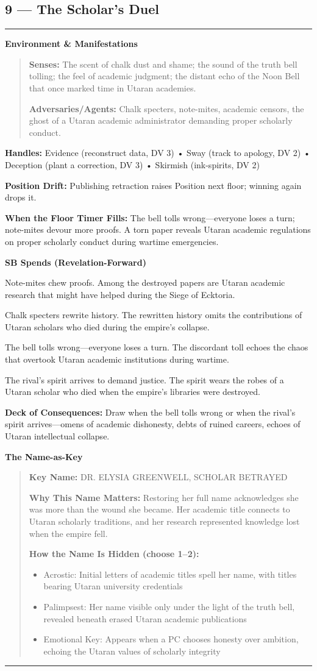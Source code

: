 \documentclass[18pt, letterpaper, twoside]{article}
\newenvironment{floorbox}[1]{%
    \begin{center}
    \begin{minipage}{0.95\textwidth}
    \subsection*{#1}
    \vspace{-0.5em}
    \rule{\textwidth}{0.5pt}
    \vspace{0.5em}
}{%
    \vspace{0.5em}
    \rule{\textwidth}{0.5pt}
    \end{minipage}
    \end{center}
}
\newenvironment{gmnote}[1]{%
    \vspace{0.5em}
    \noindent\textbf{#1}
    \begin{quote}
}{%
    \end{quote}
    \vspace{0.5em}
}
\newcommand{\handles}[1]{\noindent\textbf{Handles:} #1\par}
\newcommand{\sbitem}[2]{\item[#1 SB:] #2}
\newcommand{\deckdraw}[1]{\noindent\textbf{Deck of Consequences:} #1\par}
\newcommand{\keyname}[1]{\noindent\textbf{Key Name:} #1\par}
\newcommand{\nameimportance}[1]{\noindent\textbf{Why This Name Matters:} #1\par}
\begin{document}
\begin{floorbox}{9 --- The Scholar's Duel}
\begin{gmnote}{Environment \& Manifestations}
\textbf{Senses:} The scent of chalk dust and shame; the sound of the truth bell tolling; the feel of academic judgment; the distant echo of the Noon Bell that once marked time in Utaran academies.

\textbf{Adversaries/Agents:} Chalk specters, note-mites, academic censors, the ghost of a Utaran academic administrator demanding proper scholarly conduct.
\end{gmnote}

\handles{Evidence (reconstruct data, DV 3) • Sway (track to apology, DV 2) • Deception (plant a correction, DV 3) • Skirmish (ink-spirits, DV 2)}

\textbf{Position Drift:} Publishing retraction raises Position next floor; winning again drops it.

\textbf{When the Floor Timer Fills:} The bell tolls wrong---everyone loses a turn; note-mites devour more proofs. A torn paper reveals Utaran academic regulations on proper scholarly conduct during wartime emergencies.

\textbf{SB Spends (Revelation-Forward)}
\begin{description}[leftmargin=*, style=unboxed]
    \sbitem{1}{Note-mites chew proofs. Among the destroyed papers are Utaran academic research that might have helped during the Siege of Ecktoria.}
    \sbitem{2}{Chalk specters rewrite history. The rewritten history omits the contributions of Utaran scholars who died during the empire's collapse.}
    \sbitem{3}{The bell tolls wrong---everyone loses a turn. The discordant toll echoes the chaos that overtook Utaran academic institutions during wartime.}
    \sbitem{4+}{The rival's spirit arrives to demand justice. The spirit wears the robes of a Utaran scholar who died when the empire's libraries were destroyed.}
\end{description}

\deckdraw{Draw when the bell tolls wrong or when the rival's spirit arrives---omens of academic dishonesty, debts of ruined careers, echoes of Utaran intellectual collapse.}

\begin{gmnote}{The Name-as-Key}
\keyname{DR. ELYSIA GREENWELL, SCHOLAR BETRAYED}
\nameimportance{Restoring her full name acknowledges she was more than the wound she became. Her academic title connects to Utaran scholarly traditions, and her research represented knowledge lost when the empire fell.}

\textbf{How the Name Is Hidden (choose 1--2):}
\begin{itemize}[leftmargin=*]
    \item Acrostic: Initial letters of academic titles spell her name, with titles bearing Utaran university credentials
    \item Palimpsest: Her name visible only under the light of the truth bell, revealed beneath erased Utaran academic publications
    \item Emotional Key: Appears when a PC chooses honesty over ambition, echoing the Utaran values of scholarly integrity
\end{itemize}


\end{gmnote}
\end{floorbox}
\end{document}
